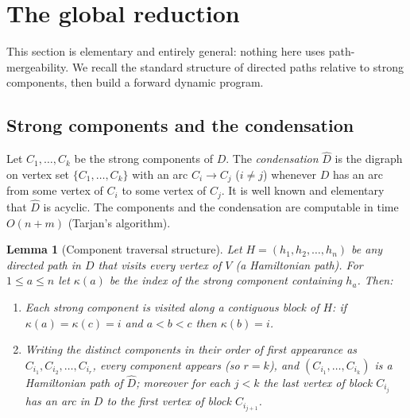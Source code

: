 \documentclass[12pt]{article}
\newtheorem{lemma}{Lemma}
\theoremstyle{definition}
\newcommand{\Vv}{V}
\begin{document}
\section{The global reduction}\label{sec:global}

This section is elementary and entirely general: nothing here uses
path-mergeability. We recall the standard structure of directed paths relative to
strong components, then build a forward dynamic program.

\subsection{Strong components and the condensation}

Let $C_{1},\dots,C_{k}$ be the strong components of $D$. The \emph{condensation}
$\widehat D$ is the digraph on vertex set $\{C_{1},\dots,C_{k}\}$ with an arc
$C_{i}\to C_{j}$ ($i\neq j$) whenever $D$ has an arc from some vertex of $C_{i}$ to
some vertex of $C_{j}$. It is well known and elementary that $\widehat D$ is
acyclic. The components and the condensation are computable in time $O(n+m)$
(Tarjan's algorithm).

\begin{lemma}[Component traversal structure]\label{lem:traversal}
Let $H=(h_{1},h_{2},\dots,h_{n})$ be any directed path in $D$ that visits every
vertex of $\Vv$ (a Hamiltonian path). For $1\le a\le n$ let $\kappa(a)$ be the
index of the strong component containing $h_{a}$. Then:
\begin{enumerate}
\item Each strong component is visited along a contiguous block of $H$: if
$\kappa(a)=\kappa(c)=i$ and $a<b<c$ then $\kappa(b)=i$.
\item Writing the distinct components in their order of first appearance as
$C_{i_{1}},C_{i_{2}},\dots,C_{i_{r}}$, every component appears (so $r=k$), and
$(C_{i_{1}},\dots,C_{i_{k}})$ is a Hamiltonian path of $\widehat D$; moreover for
each $j<k$ the last vertex of block $C_{i_{j}}$ has an arc in $D$ to the first
vertex of block $C_{i_{j+1}}$.
\end{enumerate}
\end{lemma}
\end{document}
